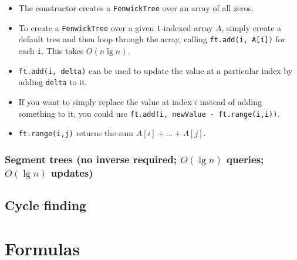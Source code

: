 \documentclass[10pt]{book}
\newcommand{\code}[1]{\inputminted[linenos=true,mathescape]{java}{code/#1}}
\newif\iftodos
\newcommand{\todo}[1]{\iftodos\textcolor{red}{[TODO: #1]}\fi}
\begin{document}
\code{range/FenwickTree.java}

\begin{itemize}
\item The constructor creates a \texttt{FenwickTree} over an array of
  all zeros.
\item To create a \texttt{FenwickTree} over a given $1$-indexed array
  $A$, simply create a default tree and then loop through the array,
  calling \texttt{ft.add(i, A[i])} for each \texttt{i}.  This takes
  $O(n \lg n)$.
\item \texttt{ft.add(i, delta)} can be used to update the value at a
  particular index by adding \texttt{delta} to it.
\item If you want to simply replace the value at index $i$ instead of
  adding something to it, you could use \texttt{ft.add(i, newValue - ft.range(i,i))}.
\item \texttt{ft.range(i,j)} returns the sum $A[i] + \dots + A[j]$.
\end{itemize}

\todo{Discuss CP3 presentation of Fenwick trees; explain how Fenwick
  trees work}

\subsection{Segment trees (no inverse required; $O(\lg n)$ queries;
  $O(\lg n)$ updates)} \label{sec:segment-trees}

\todo{Segment trees.}

\section{Cycle finding} \label{sec:cycle-finding}

\todo{Floyd's algorithm, Brent's algorithm}

\chapter{Formulas} \label{chap:formulas}
\end{document}
